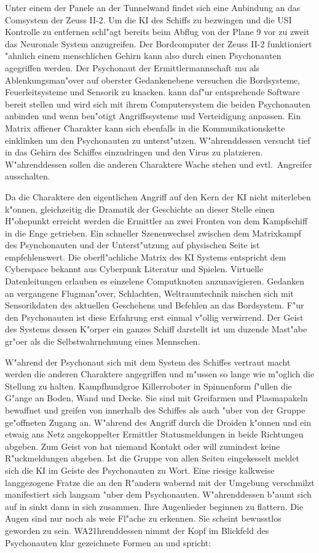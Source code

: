Unter einem der Panele an der Tunnelwand findet sich eine Anbindung an das Comsystem der Zeuss II-2. Um die KI des Schiffs zu bezwingen und die USI Kontrolle zu entfernen schl"agt \xl{} bereits beim Abflug von der Plane 9 vor zu zweit das Neuronale System anzugreifen. Der Bordcomputer der Zeuss II-2 funktioniert "ahnlich einem menschlichen Gehirn kann also durch einen Psychonauten agegriffen werden. Der Psychonaut der Ermittlermannschaft mu\3 als Ablenkungsman"over auf oberster Gedankenebene versuchen die Bordsysteme, Feuerleitsysteme und Sensorik zu knacken. \ml{} kann daf"ur entsprehende Software bereit stellen und wird sich mit ihrem Computersystem die beiden Psychonauten anbinden und wenn ben"otigt Angriffssysteme und Verteidigung anpassen. Ein Matrix affiener Charakter kann sich ebenfalls in die Kommunikationskette einklinken um den Psychonauten zu unterst"utzen. W"ahrenddessen versucht \xl{} tief in das Gehirn des Schiffes einzudringen und den Virus zu platzieren. W"ahrenddessen sollen die anderen Charaktere Wache stehen und evtl.~Angreifer ausschalten.

Da die Charaktere den eigentlichen Angriff auf den Kern der KI nicht miterleben k"onnen, gleichzeitig die Dramatik der Geschichte an dieser Stelle einen H"ohepunkt erreicht werden die Ermittler an zwei Fronten von dem Kampfschiff in die Enge getrieben. Ein schneller Szenenwechsel zwischen dem Matrixkampf des Psynchonauten und der Unterst"utzung auf physischen Seite ist empfehlenswert. Die oberfl"achliche Matrix des KI Systems entspricht dem Cyberspace bekannt aus Cyberpunk Literatur und Spielen. Virtuelle Datenleitungen erlauben es einzelene Computknoten anzunavigieren. Gedanken an vergangene Flugman"over, Schlachten, Weltraumtechnik mischen sich mit Sensorikdaten des aktuellen Geschehens und Befehlen an das Bordsystem. F"ur den Psychonauten ist diese Erfahrung erst einmal v"ollig verwirrend. Der Geist des Systems dessen K"orper ein ganzes Schiff darstellt ist um duzende Ma\3st"abe gr"o\3er als die Selbstwahrnehmung eines Mennschen.

W"ahrend der Psychonaut sich mit dem System des Schiffes vertraut macht werden die anderen Charaktere angegriffen und m"ussen so lange wie m"oglich die Stellung zu halten. Kampfhundgro\3e Killerroboter in Spinnenform f"ullen die G"ange an Boden, Wand und Decke. Sie sind mit Greifarmen und Plasmapakeln bewaffnet und greifen von innerhalb des Schiffes als auch "uber von der Gruppe ge"offneten Zugang an. W"ahrend des Angriff durch die Droiden k"onnen \ml{} und ein etwaig ans Netz angekoppelter Ermittler Statusmeldungen in beide Richtungen abgeben. Zum Geist von \xl{} hat niemand Kontakt oder \ml{} will zumindest keine R"uckmeldungen abgeben. Ist die Gruppe von allen Seiten eingekesselt meldet sich die KI im Geiste des Psychonauten zu Wort. Eine riesige kalkweise langgezogene Fratze die an den R"andern wabernd mit der Umgebung verschmilzt manifestiert sich langsam "uber dem Psychonauten. W"ahrenddessen b"aumt sich \xl{} auf in sinkt dann in sich zusammen. Ihre Augenlieder beginnen zu flattern. Die Augen sind nur noch als wei\3e Fl"ache zu erkennen. Sie scheint bewusstlos geworden zu sein. WA21hrenddessen nimmt der Kopf im Blickfeld des Psychonauten klar gezeichnete Formen an und spricht:

